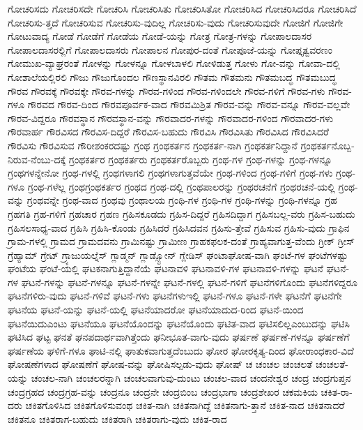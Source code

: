 {ಗೋಚರಿಸದು
ಗೋಚರಿಸದೇ
ಗೋಚರಿಸಿ
ಗೋಚರಿಸಿತು
ಗೋಚರಿಸಿತೋ
ಗೋಚರಿಸಿದ
ಗೋಚರಿಸಿದರೂ
ಗೋಚರಿಸಿದೆ
ಗೋಚರಿಸು-ತ್ತದೆ
ಗೋಚರಿಸುವ
ಗೋಚರಿಸು-ವುದಿಲ್ಲ
ಗೋಚರಿಸು-ವುದು
ಗೋಚರಿಸುವುದೇ
ಗೋಜಿಗೆ
ಗೋಜಿಗೇ
ಗೋಟುವಾದ್ಯ
ಗೋಡೆ
ಗೋಡೆಗೆ
ಗೋಡೆಯ
ಗೋಡೆ-ಯನ್ನು
ಗೋತ್ರ
ಗೋತ್ರ-ಗಳನ್ನು
ಗೋಪಾಲದಾಸರ
ಗೋಪಾಲದಾಸರಲ್ಲಿಗೆ
ಗೋಪಾಲದಾಸರು
ಗೋಪಾಲನ
ಗೋಪುರ-ದಂತೆ
ಗೋಪೂಜೆ-ಯನ್ನು
ಗೋಪ್ತೃತ್ವವರಣಂ
ಗೋಮುಖ-ವ್ಯಾಘ್ರರಂತೆ
ಗೋಳನ್ನು
ಗೋಳನ್ನೂ
ಗೋಳಬಾಳಲಿ
ಗೋಳಿಡುತ್ತ
ಗೋಳು
ಗೋ-ವನ್ನು
ಗೋವಾ-ದಲ್ಲಿ
ಗೋಶಾಲೆಯಲ್ಲಿರಲಿ
ಗೌಜು
ಗೌಜುಗೊಂದಲ
ಗೌಣಸ್ಥಾನವಿರಲಿ
ಗೌತಮ
ಗೌತಮನು
ಗೌತಮಬದ್ಧ
ಗೌತಮಬುದ್ಧ
ಗೌರವ
ಗೌರವಕ್ಕೆ
ಗೌರವಕ್ಕೇ
ಗೌರವ-ಗಳನ್ನು
ಗೌರವ-ಗಳಿಂದ
ಗೌರವ-ಗಳಿಂದಲೇ
ಗೌರವ-ಗಳಿಗೆ
ಗೌರವ-ಗಳು
ಗೌರವ-ಗಳೂ
ಗೌರವದ
ಗೌರವ-ದಿಂದ
ಗೌರವಪೂರ್ವಕ-ವಾದ
ಗೌರವಮಿಶ್ರಿತ
ಗೌರವ-ವನ್ನು
ಗೌರವ-ವನ್ನೂ
ಗೌರವ-ವಲ್ಲವೇ
ಗೌರವ-ವಿದ್ದರೂ
ಗೌರವಸ್ಥಾನ
ಗೌರವಸ್ಥಾನ-ವನ್ನು
ಗೌರವಾದರ-ಗಳನ್ನು
ಗೌರವಾದರ-ಗಳಿಂದ
ಗೌರವಾದರ-ಗಳು
ಗೌರವಾರ್ಹ
ಗೌರವಿಸದ
ಗೌರವಿಸ-ದಿದ್ದರೆ
ಗೌರವಿಸ-ಬಹುದು
ಗೌರವಿಸಿ
ಗೌರವಿಸಿತು
ಗೌರವಿಸಿದ
ಗೌರವಿಸಿದರೆ
ಗೌರವಿಸು
ಗೌರವಿಸುವ
ಗೌರೀಶಂಕರದಷ್ಟು
ಗ್ರಂಥ
ಗ್ರಂಥಕರ್ತನ
ಗ್ರಂಥಕರ್ತ-ನಾಗಿ
ಗ್ರಂಥಕರ್ತನಿದ್ದಾನೆ
ಗ್ರಂಥಕರ್ತನೊಬ್ಬ-ನಿರುವ-ನೆಂಬು-ದಕ್ಕೆ
ಗ್ರಂಥಕರ್ತರ
ಗ್ರಂಥಕರ್ತರು
ಗ್ರಂಥಕರ್ತರೊಬ್ಬರು
ಗ್ರಂಥ-ಗಳ
ಗ್ರಂಥ-ಗಳನ್ನು
ಗ್ರಂಥ-ಗಳನ್ನೂ
ಗ್ರಂಥಗಳನ್ನೇನೋ
ಗ್ರಂಥ-ಗಳಲ್ಲಿ
ಗ್ರಂಥಗಳಾಗಲಿ
ಗ್ರಂಥಗಳಾಗುತ್ತವೆಯೇ
ಗ್ರಂಥ-ಗಳಿಂದ
ಗ್ರಂಥ-ಗಳಿಗೆ
ಗ್ರಂಥ-ಗಳು
ಗ್ರಂಥ-ಗಳೂ
ಗ್ರಂಥ-ಗಳೆಲ್ಲ
ಗ್ರಂಥಗ್ರಂಥಕರ್ತರ
ಗ್ರಂಥದ
ಗ್ರಂಥ-ದಲ್ಲಿ
ಗ್ರಂಥಪಾಲರನ್ನು
ಗ್ರಂಥರಚನೆಗೆ
ಗ್ರಂಥರಚನೆ-ಯಲ್ಲಿ
ಗ್ರಂಥ-ವನ್ನು
ಗ್ರಂಥವನ್ನೇ
ಗ್ರಂಥ-ವಾದ
ಗ್ರಂಥವು
ಗ್ರಂಥಾಲಯ
ಗ್ರಂಥಿ-ಗಳ
ಗ್ರಂಥಿ-ಗಳ
ಗ್ರಂಥಿ-ಗಳನ್ನು
ಗ್ರಂಥಿ-ಗಳನ್ನೂ
ಗ್ರಹ
ಗ್ರಹಗತಿ
ಗ್ರಹ-ಗಳಿಗೆ
ಗ್ರಹಚಾರ
ಗ್ರಹಣ
ಗ್ರಹಿಸಕೂಡದು
ಗ್ರಹಿಸ-ದಿದ್ದರೆ
ಗ್ರಹಿಸದಿದ್ದಾಗ
ಗ್ರಹಿಸಬಲ್ಲ-ವರು
ಗ್ರಹಿಸ-ಬಹುದು
ಗ್ರಹಿಸಲಸಾಧ್ಯ-ವಾದ
ಗ್ರಹಿಸಿ
ಗ್ರಹಿಸಿ-ಕೊಂಡು
ಗ್ರಹಿಸಿದರೆ
ಗ್ರಹಿಸಿದವನ
ಗ್ರಹಿಸು-ತ್ತೇವೆ
ಗ್ರಹಿಸುವ
ಗ್ರಹಿಸು-ವುದು
ಗ್ರಾಫಿನ
ಗ್ರಾಮ-ಗಳಲ್ಲಿ
ಗ್ರಾಮದ
ಗ್ರಾಮದವನು
ಗ್ರಾಮಿನಷ್ಟು
ಗ್ರಾಮೀಣ
ಗ್ರಾಹಕಫಲಕ-ದಂತೆ
ಗ್ರಾಹ್ಯವಾಗುತ್ತ-ವೆಂದು
ಗ್ರೀಕ್
ಗ್ರೀಸ್
ಗ್ರೆಹ್ಯಾಮ್
ಗ್ರೇಟ್
ಗ್ರ್ಯಾಜುಯಲ್ನೆಸ್
ಗ್ಲಾಡ್ಮನ್
ಗ್ಲಾಡ್ಸ್ಟೋನ್
ಗ್ಲೇಡಿಸ್
ಘಂಟಾಘೋಷ-ವಾಗಿ
ಘಂಟೆ-ಗಳ
ಘಂಟೆಗಳಷ್ಟು
ಘಂಟೆಯ
ಘಂಟೆ-ಯಲ್ಲಿ
ಘಟಕನಾಗುತ್ತಿದ್ದಾನೆಯೆ
ಘಟನಾವಳಿ
ಘಟನಾವಳಿ-ಗಳ
ಘಟನಾವಳಿ-ಗಳನ್ನು
ಘಟನೆ
ಘಟನೆ-ಗಳ
ಘಟನೆ-ಗಳನ್ನು
ಘಟನೆ-ಗಳನ್ನೂ
ಘಟನೆ-ಗಳನ್ನೇ
ಘಟನೆ-ಗಳಲ್ಲಿ
ಘಟನೆ-ಗಳಿಗೆ
ಘಟನೆಗಳಿಗೊಂದು
ಘಟನೆಗಳಿದ್ದರೂ
ಘಟನೆಗಳಿರು-ವುದು
ಘಟನೆ-ಗಳಿವೆ
ಘಟನೆ-ಗಳು
ಘಟನೆಗಳುಇಲ್ಲಿ
ಘಟನೆ-ಗಳೂ
ಘಟನೆ-ಗಳೇ
ಘಟನೆಗೆ
ಘಟನೆಗೇ
ಘಟನೆಯ
ಘಟನೆ-ಯನ್ನು
ಘಟನೆ-ಯಲ್ಲಿ
ಘಟನೆಯಾದರೋ
ಘಟನೆಯಾದುದ-ರಿಂದ
ಘಟನೆ-ಯಿಂದ
ಘಟನೆಯಿದುಎಂಟು
ಘಟನೆಯೂ
ಘಟನೆಯೊಂದನ್ನು
ಘಟನೆಯೊಂದು
ಘಟಿತ-ವಾದ
ಘಟಿಸಲಿಲ್ಲಎಂಬುದನ್ನು
ಘಟಿಸಿ
ಘಟಿಸಿದ
ಘಟ್ಟ
ಘನತೆ
ಘನಪದಾರ್ಥವಾಗಿತ್ತೆಂದು
ಘನೀಭೂತ-ವಾಗು-ವುದು
ಘರ್ಷಣೆ
ಘರ್ಷಣೆ-ಗಳನ್ನೂ
ಘರ್ಷಣೆಗೆ
ಘರ್ಷಣೆಯ
ಘಳಿಗೆ-ಗಳೂ
ಘಾಟಿ-ನಲ್ಲಿ
ಘಾತುಕವಾಗುತ್ತದೆಂಬುದು
ಘೋರ
ಘೋರಕೃತ್ಯ-ದಿಂದ
ಘೋರಾಂಧಕಾರ-ವಿದೆ
ಘೋಷಣೆಗಳಾದ
ಘೋಷಣೆಗೆ
ಘೋಷ-ವನ್ನು
ಘೋಷಿಸಲ್ಪಡು-ವುದು
ಘೋಷ್
ಚ
ಚಂಚಲ
ಚಂಚಲತೆ
ಚಂಚಲತೆ-ಯನ್ನು
ಚಂಚಲ-ನಾಗಿ
ಚಂಚಲರನ್ನಾಗಿ
ಚಂಚಲವಾಗುವು-ದುಂಟು
ಚಂಚಲ-ವಾದ
ಚಂದನೇಶ್ವರ
ಚಂದ್ರ
ಚಂದ್ರಗುಪ್ತನ
ಚಂದ್ರಗ್ರಹದ
ಚಂದ್ರಗ್ರಹ-ವನ್ನು
ಚಂದ್ರನೂ
ಚಂದ್ರನೇ
ಚಂದ್ರಬಿಂಬ
ಚಂದ್ರಭಾಗಾ
ಚಂದ್ರಶೇಖರ
ಚಕಮಕಿಯ
ಚಕಿತ-ರಾ-ದರು
ಚಕಿತಗೊಳಿಸಿದ
ಚಕಿತಗೊಳಿಸುವಂಥ
ಚಕಿತ-ನಾಗಿ
ಚಕಿತನಾಗಿದ್ದೆ
ಚಕಿತನಾಗು-ತ್ತಾನೆ
ಚಕಿತ-ನಾದ
ಚಕಿತನಾದರೆ
ಚಕಿತನೂ
ಚಕಿತರಾಗ-ಬಹುದು
ಚಕಿತರಾಗಿ
ಚಕಿತರಾಗು-ವುದು
ಚಕಿತ-ರಾದ
}
